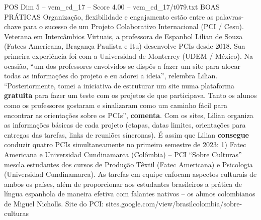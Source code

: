 \begin{textsample}{POS Dim 5 – vem\_ed\_17 – Score 4.00 – vem\_ed\_17/t079.txt}  \label{ex:f5_pos_137}
BOAS PRÁTICAS Organização, flexibilidade e engajamento estão entre as palavras-chave para o sucesso de um Projeto Colaborativo Internacional (PCI / Cesu).
Veterana em Intercâmbios Virtuais, a professora de Espanhol Lilian de Souza (Fatecs Americana, Bragança Paulista e Itu) desenvolve PCIs desde 2018.
Sua primeira experiência foi com a Universidad de Monterrey (UDEM / México).
Na ocasião, “um dos professores envolvidos se dispôs a fazer um site para alocar todas as informações do projeto e eu adorei a ideia”, relembra Lilian. “Posteriormente, tomei a iniciativa de estruturar um site numa plataforma \textbf{gratuita} para fazer um teste com os projetos de que participava.
Tanto os alunos como os professores gostaram e sinalizaram como um caminho fácil para encontrar as orientações sobre os PCIs”, \textbf{comenta}.
Com os sites, Lilian organiza as informações básicas de cada projeto (etapas, datas limites, orientações para entregas das tarefas, links de reuniões síncronas).
É assim que Lilian \textbf{consegue} conduzir quatro PCIs simultaneamente no primeiro semestre de 2023: 1) Fatec Americana e Universidad Cundinamarca (Colômbia) – PCI “Sobre Culturas” mescla estudantes dos cursos de Produção Têxtil (Fatec Americana) e Psicologia (Universidad Cundinamarca).
As tarefas em equipe enfocam aspectos culturais de ambos os países, além de proporcionar aos estudantes brasileiros a prática de língua espanhola de maneira efetiva com falantes nativos – os alunos colombianos de Miguel Nicholls.
Site do PCI: sites.google.com/view/brasilcolombia/sobre-culturas

\end{textsample}

